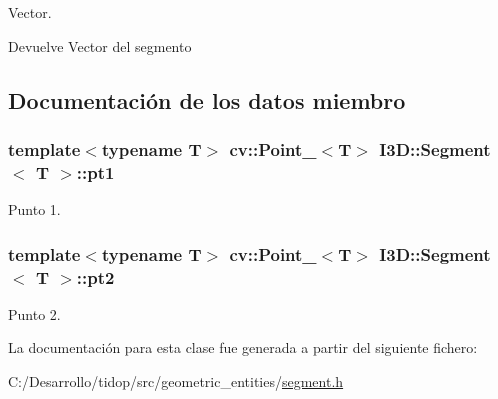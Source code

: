 Vector. 

\begin{DoxyReturn}{Devuelve}
Vector del segmento 
\end{DoxyReturn}


\subsection{Documentación de los datos miembro}
\subsubsection[{\texorpdfstring{pt1}{pt1}}]{\setlength{\rightskip}{0pt plus 5cm}template$<$typename T$>$ cv\+::\+Point\+\_\+$<$T$>$ {\bf I3\+D\+::\+Segment}$<$ T $>$\+::pt1}\hypertarget{class_i3_d_1_1_segment_a5d431900fec31fe43607218ba4c382be}{}\label{class_i3_d_1_1_segment_a5d431900fec31fe43607218ba4c382be}


Punto 1. 

\subsubsection[{\texorpdfstring{pt2}{pt2}}]{\setlength{\rightskip}{0pt plus 5cm}template$<$typename T$>$ cv\+::\+Point\+\_\+$<$T$>$ {\bf I3\+D\+::\+Segment}$<$ T $>$\+::pt2}\hypertarget{class_i3_d_1_1_segment_a15813aa4738a8e5ea4a06ad56fdb0e6d}{}\label{class_i3_d_1_1_segment_a15813aa4738a8e5ea4a06ad56fdb0e6d}


Punto 2. 



La documentación para esta clase fue generada a partir del siguiente fichero\+:\begin{DoxyCompactItemize}
\item 
C\+:/\+Desarrollo/tidop/src/geometric\+\_\+entities/\hyperlink{segment_8h}{segment.\+h}\end{DoxyCompactItemize}
